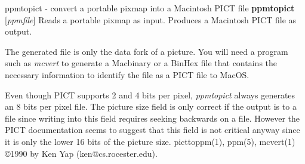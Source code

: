 %

\newpage
%

ppmtopict - convert a portable pixmap into a Macintosh PICT file
{\bf ppmtopict}
{\rm [}{\it ppmfile}{\rm ]}
Reads a portable pixmap as input.
Produces a Macintosh PICT file as output.
\par
The generated file is only the data fork of a picture.
You will need a program such as
{\it mcvert}
to generate a Macbinary or a BinHex file that contains the necessary
information to identify the file as a PICT file to MacOS.
\par
Even though PICT supports 2 and 4 bits per pixel,
{\it ppmtopict}
always generates an 8 bits per pixel file.
The picture size field is only correct if the output is to a file
since writing into this field requires seeking backwards on a file.
However the PICT documentation seems to suggest that this field is
not critical anyway since it is only the lower 16 bits of the picture size.
picttoppm(1), ppm(5), mcvert(1)
\copyright 1990 by Ken Yap (ken@cs.rocester.edu).
%
 
%

